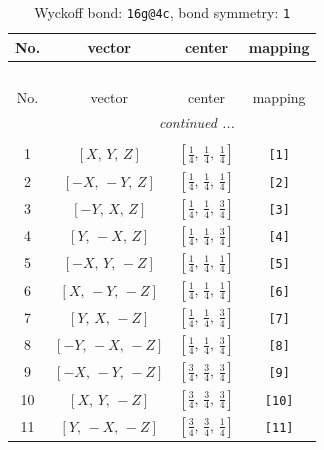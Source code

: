 \documentclass[fleqn,8pt]{jsarticle}
\begin{document}
\begin{longtable}{cccc}
\caption{Wyckoff bond: {\tt 16g@4c}, bond symmetry: {\tt 1}}
 \\
 \hline \hline
No. & vector & center & mapping \\ \hline \endfirsthead

\multicolumn{3}{l}{\tablename\ \thetable{}} \\
 \hline \hline
No. & vector & center & mapping \\ \hline \endhead

 \hline \hline
\multicolumn{3}{r}{\footnotesize\it continued ...} \\ \endfoot

 \hline \hline
\multicolumn{3}{r}{} \\ \endlastfoot

1 & $\left[ X,\, Y,\, Z \right]$ & $\left[ \frac{1}{4},\, \frac{1}{4},\, \frac{1}{4} \right]$ & {\tt [1]} \\ \hline
2 & $\left[ - X,\, - Y,\, Z \right]$ & $\left[ \frac{1}{4},\, \frac{1}{4},\, \frac{1}{4} \right]$ & {\tt [2]} \\ \hline
3 & $\left[ - Y,\, X,\, Z \right]$ & $\left[ \frac{1}{4},\, \frac{1}{4},\, \frac{3}{4} \right]$ & {\tt [3]} \\ \hline
4 & $\left[ Y,\, - X,\, Z \right]$ & $\left[ \frac{1}{4},\, \frac{1}{4},\, \frac{3}{4} \right]$ & {\tt [4]} \\ \hline
5 & $\left[ - X,\, Y,\, - Z \right]$ & $\left[ \frac{1}{4},\, \frac{1}{4},\, \frac{1}{4} \right]$ & {\tt [5]} \\ \hline
6 & $\left[ X,\, - Y,\, - Z \right]$ & $\left[ \frac{1}{4},\, \frac{1}{4},\, \frac{1}{4} \right]$ & {\tt [6]} \\ \hline
7 & $\left[ Y,\, X,\, - Z \right]$ & $\left[ \frac{1}{4},\, \frac{1}{4},\, \frac{3}{4} \right]$ & {\tt [7]} \\ \hline
8 & $\left[ - Y,\, - X,\, - Z \right]$ & $\left[ \frac{1}{4},\, \frac{1}{4},\, \frac{3}{4} \right]$ & {\tt [8]} \\ \hline
9 & $\left[ - X,\, - Y,\, - Z \right]$ & $\left[ \frac{3}{4},\, \frac{3}{4},\, \frac{3}{4} \right]$ & {\tt [9]} \\ \hline
10 & $\left[ X,\, Y,\, - Z \right]$ & $\left[ \frac{3}{4},\, \frac{3}{4},\, \frac{3}{4} \right]$ & {\tt [10]} \\ \hline
11 & $\left[ Y,\, - X,\, - Z \right]$ & $\left[ \frac{3}{4},\, \frac{3}{4},\, \frac{1}{4} \right]$ & {\tt [11]} \\ \hline

\end{longtable}
\end{document}
